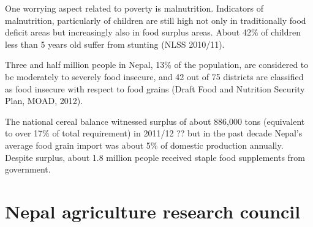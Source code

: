 \documentclass[
  openany]{book}
\begin{document}
One worrying aspect related to poverty is malnutrition. Indicators of malnutrition, particularly of children are still high not only in traditionally food deficit areas but increasingly also in food surplus areas. About 42\% of children less than 5 years old suffer from stunting (NLSS 2010/11).

Three and half million people in Nepal, 13\% of the population, are considered to be moderately to severely food insecure, and 42 out of 75 districts are classified as food insecure with respect to food grains (Draft Food and Nutrition Security Plan, MOAD, 2012).

The national cereal balance witnessed surplus of about 886,000 tons (equivalent to over 17\% of total requirement) in 2011/12 ?? but in the past decade Nepal's average food grain import was about 5\% of domestic production annually. Despite surplus, about 1.8 million people received staple food supplements from government.

\hypertarget{nepal-agriculture-research-council}{%
\section{Nepal agriculture research council}\label{nepal-agriculture-research-council}}
\end{document}
